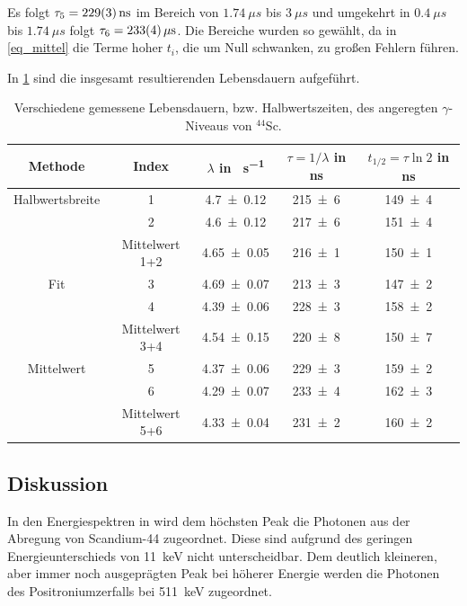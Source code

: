 \documentclass[
	a4paper,
	12pt,
	pagesize,
	ngerman
]{scrartcl}
\begin{document}
		Es folgt $\tau_5=\SI{229+-3}{ns}$ im Bereich von $\SI{1.74}{\mu s}$ bis $\SI{3}{\mu s}$ und umgekehrt in $\SI{0.4}{\mu s}$ bis $\SI{1.74}{\mu s}$ folgt $\tau_6=\SI{233+-4}{\mu s}$.
		Die Bereiche wurden so gewählt, da in \cref{eq_mittel} die Terme hoher $t_i$, die um Null schwanken, zu großen Fehlern führen.

		In \cref{tb_leb} sind die insgesamt resultierenden Lebensdauern aufgeführt.
		\begin{table}[H]
		\centering
		\begin{tabular}{c| c | c | c | c  }
			 Methode&Index&$\lambda$ in \si{\mu s^{-1}}& $\tau=1/\lambda$ in \si{ns} &$t_{1/2}=\tau\ln 2$ in \si{ns}\\ \hline
			 Halbwertsbreite&1&\SI{4.7+-0.12}{}&\SI{215+-6}{}&\SI{149+-4}{}\\
			 &2&\SI{4.6+-0.12}{}&\SI{217+-6}{}&\SI{151+-4}{}\\
			 &Mittelwert 1+2&\SI{4.65+-0.05}{}&\SI{216+-1}{}&\SI{150+-1}{}\\\hline
			 Fit&3&\SI{4.69+-0.07}{}&\SI{213+-3}{}&\SI{147+-2}{} \\
			 &4&\SI{4.39+-0.06}{}&\SI{228+-3}{}&\SI{158+-2}{} \\
			 &Mittelwert 3+4&\SI{4.54+-0.15}{}&\SI{220+-8}{}&\SI{150+-7}{}\\\hline
			 Mittelwert&5&\SI{4.37+-0.06}{}&\SI{229+-3}{}&\SI{159+-2}{}\\
			 &6&\SI{4.29+-0.07}{}&\SI{233+-4}{}&\SI{162+-3}{}\\
			 &Mittelwert 5+6&\SI{4.33+-0.04}{}&\SI{231+-2}{}&\SI{160+-2}{}\\\hline
		\end{tabular}
		\caption{
		Verschiedene gemessene Lebensdauern, bzw. Halbwertszeiten, des angeregten $\gamma$-Niveaus von $^{44}$Sc.
		}
			 \label{tb_leb}
	\end{table}
	\subsection{Diskussion}
	In den Energiespektren in  wird dem höchsten Peak die Photonen aus der Abregung von Scandium-44 zugeordnet.
	Diese sind aufgrund des geringen Energieunterschieds von \SI{11}{keV} nicht unterscheidbar.
	Dem deutlich kleineren, aber immer noch ausgeprägten Peak bei höherer Energie werden die Photonen des Positroniumzerfalls bei \SI{511}{keV} zugeordnet.
\end{document}
